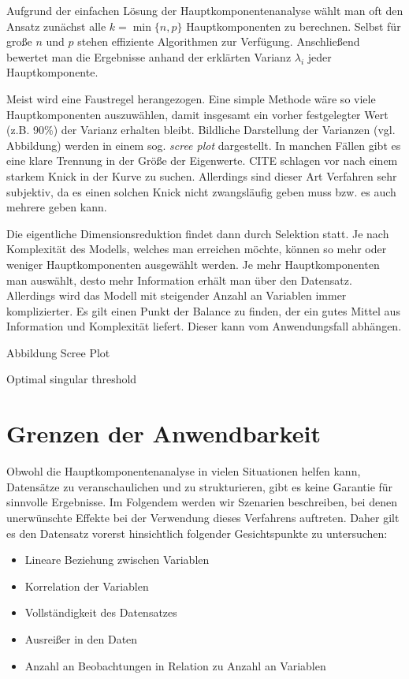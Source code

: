 Aufgrund der einfachen Lösung der Hauptkomponentenanalyse wählt man oft den Ansatz zunächst alle $k = \min\{n, p\}$ Hauptkomponenten zu berechnen. Selbst für große $n$ und $p$ stehen effiziente Algorithmen zur Verfügung. Anschließend bewertet man die Ergebnisse anhand der erklärten Varianz $\lambda_i$ jeder Hauptkomponente. 

Meist wird eine Faustregel herangezogen. Eine simple Methode wäre so viele Hauptkomponenten auszuwählen, damit insgesamt ein vorher festgelegter Wert (z.B. 90\%) der Varianz erhalten bleibt. Bildliche Darstellung der Varianzen (vgl. Abbildung) werden in einem sog. \textit{scree plot} dargestellt. In manchen Fällen gibt es eine klare Trennung in der Größe der Eigenwerte. CITE schlagen vor nach einem starkem Knick in der Kurve zu suchen. Allerdings sind dieser Art Verfahren sehr subjektiv, da es einen solchen Knick nicht zwangsläufig geben muss bzw. es auch mehrere geben kann.

Die eigentliche Dimensionsreduktion findet dann durch Selektion statt. Je nach Komplexität des Modells, welches man erreichen möchte, können so mehr oder weniger Hauptkomponenten ausgewählt werden. Je mehr Hauptkomponenten man auswählt, desto mehr Information erhält man über den Datensatz. Allerdings wird das Modell mit steigender Anzahl an Variablen immer komplizierter. Es gilt einen Punkt der Balance zu finden, der ein gutes Mittel aus Information und Komplexität liefert. Dieser kann vom Anwendungsfall abhängen. 

Abbildung Scree Plot

Optimal singular threshold \cite{gavish}

\section{Grenzen der Anwendbarkeit} \label{theo_results}

Obwohl die Hauptkomponentenanalyse in vielen Situationen helfen kann, Datensätze zu veranschaulichen und zu strukturieren, gibt es keine Garantie für sinnvolle Ergebnisse. Im Folgendem werden wir Szenarien beschreiben, bei denen unerwünschte Effekte bei der Verwendung dieses Verfahrens auftreten. Daher gilt es den Datensatz vorerst hinsichtlich folgender Gesichtspunkte zu untersuchen: 

\begin{itemize}
\item Lineare Beziehung zwischen Variablen
\item Korrelation der Variablen
\item Vollständigkeit des Datensatzes
\item Ausreißer in den Daten
\item Anzahl an Beobachtungen in Relation zu Anzahl an Variablen
\end{itemize}

